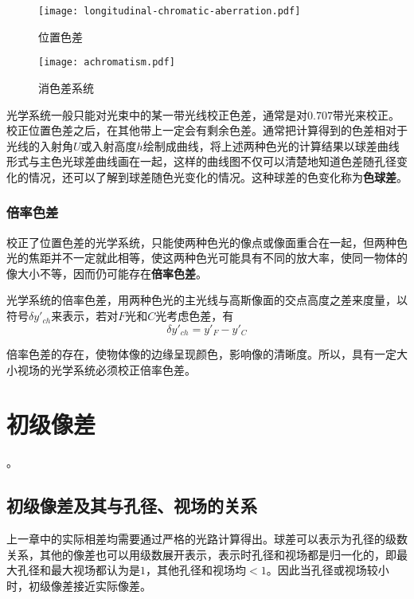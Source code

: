 \documentclass[cn,10pt,chinesefont=founder,math=mtpro2,cite=super,toc=onecol,twoside,openany]{elegantbook}
\begin{document}
\begin{figure}[htbp]
	\centering
	\begin{minipage}[t]{0.45\textwidth}
		\centering
		\texttt{[image: longitudinal-chromatic-aberration.pdf]}
		\caption{位置色差}
		\label{fig:longitudinal-chromatic-aberration}
	\end{minipage}
	\quad
	\begin{minipage}[t]{0.45\textwidth}
		\centering
		\texttt{[image: achromatism.pdf]}
		\caption{消色差系统}
		\label{fig:achromatism}
	\end{minipage}
\end{figure}

光学系统一般只能对光束中的某一带光线校正色差，通常是对$0.707$带光来校正。校正位置色差之后，在其他带上一定会有剩余色差。通常把计算得到的色差相对于光线的入射角$U$或入射高度$h$绘制成曲线，将上述两种色光的计算结果以球差曲线形式与主色光球差曲线画在一起，这样的曲线图不仅可以清楚地知道色差随孔径变化的情况，还可以了解到球差随色光变化的情况。这种球差的色变化称为\textbf{色球差}。

\subsection{倍率色差}
校正了位置色差的光学系统，只能使两种色光的像点或像面重合在一起，但两种色光的焦距并不一定就此相等，使这两种色光可能具有不同的放大率，使同一物体的像大小不等，因而仍可能存在\textbf{倍率色差}。

光学系统的倍率色差，用两种色光的主光线与高斯像面的交点高度之差来度量，以符号$\delta y'_{ch}$来表示，若对$F$光和$C$光考虑色差，有
\begin{equation}
\delta y'_{ch}=y'_F-y'_C
\end{equation}

倍率色差的存在，使物体像的边缘呈现颜色，影响像的清晰度。所以，具有一定大小视场的光学系统必须校正倍率色差。

\chapter{初级像差}。

\section{初级像差及其与孔径、视场的关系}

上一章中的实际相差均需要通过严格的光路计算得出。球差可以表示为孔径的级数关系，其他的像差也可以用级数展开表示，表示时孔径和视场都是归一化的，即最大孔径和最大视场都认为是$1$，其他孔径和视场均$<1$。因此当孔径或视场较小时，初级像差接近实际像差。
\end{document}
